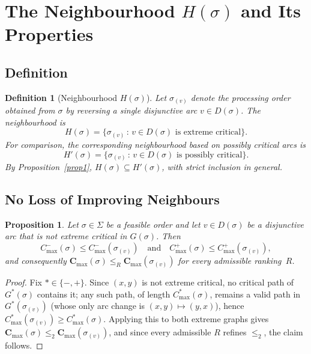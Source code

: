 \documentclass[preprint,12pt]{elsarticle}
\newtheorem{proposition}{Proposition}
\newtheorem{definition}{Definition}
\begin{document}
\section{The Neighbourhood $H(\sigma)$ and Its Properties}
\label{sec:H}

\subsection{Definition}
\label{sec:H-def}

\begin{definition}[Neighbourhood $H(\sigma)$]
\label{def2}
Let $\sigma_{(v)}$ denote the processing order obtained from $\sigma$ by reversing a single disjunctive arc $v \in D(\sigma)$. The neighbourhood is
\begin{equation}
H(\sigma) = \{ \sigma_{(v)} \,:\, v \in D(\sigma) \text{ is extreme critical}\}.
\end{equation}
For comparison, the corresponding neighbourhood based on \emph{possibly} critical arcs is
\begin{equation}
H'(\sigma) = \{ \sigma_{(v)} \,:\, v \in D(\sigma) \text{ is possibly critical}\}.
\end{equation}
By Proposition~\ref{prop1}, $H(\sigma) \subseteq H'(\sigma)$, with strict inclusion in general.
\end{definition}

\subsection{No Loss of Improving Neighbours}
\label{sec:H-noloss}

\begin{proposition}
\label{prop2}
Let $\sigma \in \Sigma$ be a feasible order and let $v \in D(\sigma)$ be a disjunctive arc that is \emph{not} extreme critical in $G(\sigma)$. Then
\begin{equation}
C^-_{\max}(\sigma) \leq C^-_{\max}(\sigma_{(v)}) \quad\text{and}\quad C^+_{\max}(\sigma) \leq C^+_{\max}(\sigma_{(v)}),
\end{equation}
and consequently $\mathbf{C}_{\max}(\sigma) \leq_{R} \mathbf{C}_{\max}(\sigma_{(v)})$ for every admissible ranking~$R$.
\end{proposition}

\begin{proof}
Fix $*\in\{-,+\}$. Since $(x,y)$ is not extreme critical, no critical path of $G^*(\sigma)$ contains it; any such path, of length $C^*_{\max}(\sigma)$, remains a valid path in $G^*(\sigma_{(v)})$ (whose only arc change is $(x,y)\mapsto(y,x)$), hence $C^*_{\max}(\sigma_{(v)})\ge C^*_{\max}(\sigma)$. Applying this to both extreme graphs gives $\mathbf{C}_{\max}(\sigma)\le_2\mathbf{C}_{\max}(\sigma_{(v)})$, and since every admissible $R$ refines $\le_2$, the claim follows.
\end{proof}
\end{document}
